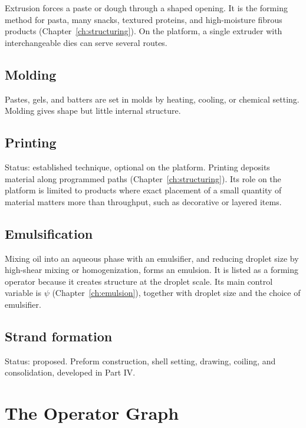 \documentclass[11pt,openany]{book}
\theoremstyle{definition}
\begin{document}
Extrusion forces a paste or dough through a shaped opening. It is the forming method for pasta, many snacks, textured proteins, and high-moisture fibrous products (Chapter~\ref{ch:structuring}). On the platform, a single extruder with interchangeable dies can serve several routes.

\section{Molding}

Pastes, gels, and batters are set in molds by heating, cooling, or chemical setting. Molding gives shape but little internal structure.

\section{Printing}

Status: established technique, optional on the platform. Printing deposits material along programmed paths (Chapter~\ref{ch:structuring}). Its role on the platform is limited to products where exact placement of a small quantity of material matters more than throughput, such as decorative or layered items.

\section{Emulsification}

Mixing oil into an aqueous phase with an emulsifier, and reducing droplet size by high-shear mixing or homogenization, forms an emulsion. It is listed as a forming operator because it creates structure at the droplet scale. Its main control variable is $\psi$ (Chapter~\ref{ch:emulsion}), together with droplet size and the choice of emulsifier.

\section{Strand formation}

Status: proposed. Preform construction, shell setting, drawing, coiling, and consolidation, developed in Part IV.

\chapter{The Operator Graph}\label{ch:graph}
\end{document}
